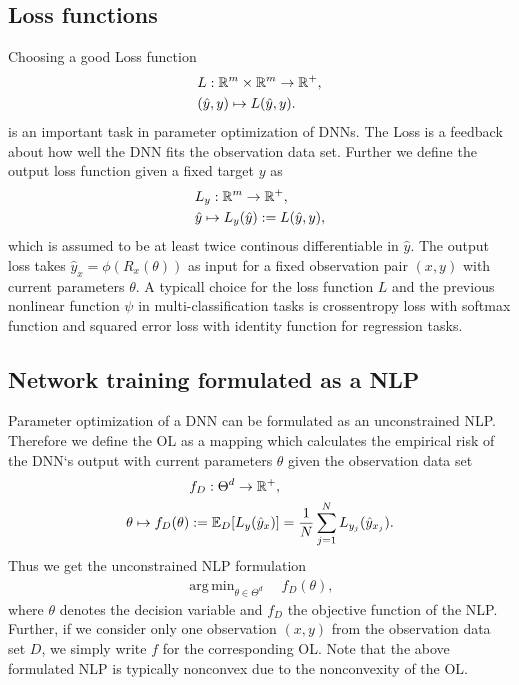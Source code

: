 \documentclass[conference]{IEEEtran}
\DeclareMathOperator*{\argmin}{arg\,min}
\begin{document}
	\subsection{Loss functions}
	\noindent
	Choosing a good Loss function
	\begin{align}
	&L:\mathbb{R}^{m}\times \mathbb{R}^{m}\rightarrow \mathbb{R}^{+}, \notag\\
	&(\hat{y}, y)\mapsto L(\hat{y}, y). 
	\end{align}
	is an important task in parameter optimization of DNNs. The Loss is a feedback about how well the DNN fits the observation data set. Further we define the output loss function given a fixed target $y$ as
	\begin{align}
	&L_{y}:\mathbb{R}^{m}\rightarrow \mathbb{R}^{+}, \notag\\
	&\hat{y}\mapsto L_{y}(\hat{y}) := L(\hat{y}, y), 
	\end{align}
	which is assumed to be at least twice continous differentiable in $\hat{y}$. The output loss takes $\hat{y}_{x} = \phi(R_{x}(\theta))$ as input for a fixed observation pair $(x, y)$ with current parameters $\theta$. A typicall choice for the loss function $L$ and the previous nonlinear function $\psi$ in multi-classification tasks is crossentropy loss with softmax function and squared error loss with identity function for regression tasks.
	
	
	
	\subsection{Network training formulated as a NLP}
	\noindent
	Parameter optimization of a DNN can be formulated as an unconstrained NLP. Therefore we define the OL as a mapping which calculates the empirical risk of the DNN`s output with current parameters $\theta$ given the observation data set
	\begin{align}
	&f_{D}:\Theta^{d}\rightarrow\mathbb{R}^{+}, \notag\\
	\theta\mapsto f_{D}(\theta) &:= \mathbb{E}_{D}[L_{y}(\hat{y}_{x})] =  \frac{1}{N}\sum_{j = 1}^{N}L_{y_{j}}(\hat{y}_{x_{j}}).
	\end{align}
	Thus we get the unconstrained NLP formulation
	\begin{align}
	\argmin_{\theta\in\Theta^{d}}\quad f_{D}(\theta),
	\end{align}
	where $\theta$ denotes the decision variable and $f_{D}$ the objective function of the NLP.
	Further, if we consider only one observation $(x, y)$ from the observation data set $D$, we simply write  $f$ for the corresponding OL. Note that the above formulated NLP is typically nonconvex due to the nonconvexity of the OL.
	
\end{document}
